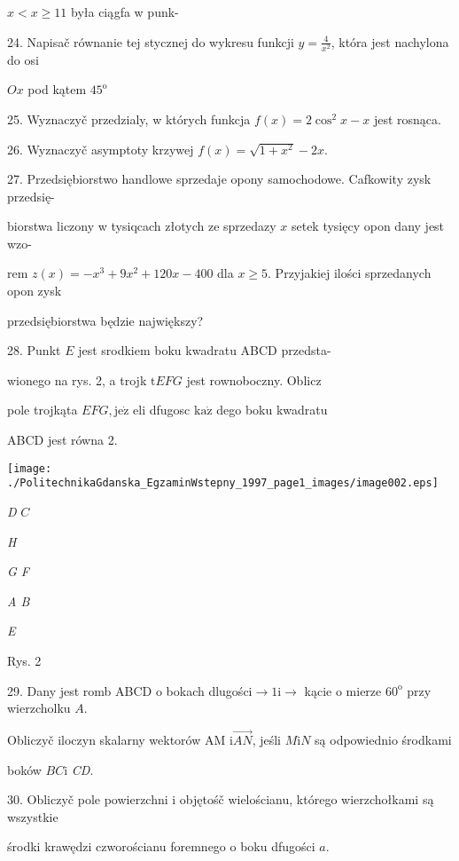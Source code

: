 \documentclass[a4paper,12pt]{article}
\begin{document}
$x<x\geq 11$ była ciągfa w punk-

24. Napisač równanie tej stycznej do wykresu funkcji $y=\displaystyle \frac{4}{x^{2}}$, która jest nachylona do osi

$Ox$ pod kątem $45^{\mathrm{o}}$

25. Wyznaczyč przedzialy, w których funkcja $f(x)=2\cos^{2}x-x$ jest rosnąca.

26. Wyznaczyč asymptoty krzywej $f(x)=\sqrt{1+x^{2}}-2x.$

27. Przedsiębiorstwo handlowe sprzedaje opony samochodowe. Cafkowity zysk przedsię-

biorstwa liczony w tysiqcach złotych ze sprzedazy $x$ setek tysięcy opon dany jest wzo-

rem $z(x)=-x^{3}+9x^{2}+120x-400$ dla $x\geq 5$. Przyjakiej ilości sprzedanych opon zysk

przedsiębiorstwa będzie największy?

28. Punkt $E$ jest srodkiem boku kwadratu ABCD przedsta-

wionego na rys. 2, a trojk $\mathrm{t}EFG$ jest rownoboczny. Oblicz

pole trojkąta $EFG, \mathrm{j}\mathrm{e}\dot{\mathrm{z}}$ eli dfugosc $\mathrm{k}\mathrm{a}\dot{\mathrm{z}}$ dego boku kwadratu

ABCD jest równa 2.
\begin{center}
\texttt{[image: ./PolitechnikaGdanska\_EgzaminWstepny\_1997\_page1\_images/image002.eps]}
\end{center}
{\it D} $C$

{\it H}

{\it G F}

{\it A B}

{\it E}

Rys. 2

29. Dany jest romb ABCD o bokach dlugości$\rightarrow  1\mathrm{i}\rightarrow$ kącie o mierze $60^{\mathrm{o}}$ przy wierzcholku $A.$

Obliczyč iloczyn skalarny wektorów AM $\mathrm{i}\vec{AN}$, jeśli $M\mathrm{i}N$ są odpowiednio środkami

boków $BC\mathrm{i}$ {\it CD}.

30. Obliczyč pole powierzchni i objętośč wielościanu, którego wierzchołkami są wszystkie

środki krawędzi czworościanu foremnego o boku dfugości $a.$
\end{document}
